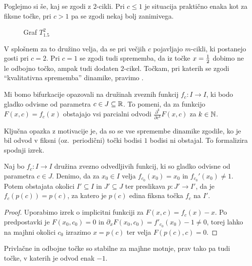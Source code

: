 Poglejmo si še, kaj se zgodi z $2$-cikli.
Pri $c \le 1$ je situacija praktično enaka kot za fiksne točke, pri $c > 1$ pa
se zgodi nekaj bolj zanimivega.

\begin{figure}[h]
  \centering
  \caption{Graf $T_{1.5}^2$}
  \label{fig:ds-02-tc-2}
\end{figure}

V splošnem za to družino velja, da se pri večjih $c$ pojavljajo $m$-cikli, ki
postanejo gosti pri $c = 2$.
Pri $c = 1$ se zgodi tudi sprememba, da iz točke $x = \frac{1}{2}$ dobimo ne le odbojno
točko, ampak tudi dodaten $2$-cikel.
Točkam, pri katerih se zgodi \enquote{kvalitativna sprememba} dinamike, pravimo
.

Mi bomo bifurkacije opazovali na družinah zveznih funkcij $f_c: I \to I$, ki
bodo gladko odvisne od parametra $c \in J \subseteq \mathbb{R}$.
To pomeni, da za funkcijo $F(x, c) = f_c(x)$ obstajajo vsi parcialni odvodi
$\frac{\partial^k}{\partial c^k} F(x,c)$ za $k \in \mathbb{N}$.

Ključna opazka z motivacije je, da so se vse spremembe dinamike zgodile, ko je
bil odvod v fiksni (oz.~periodični) točki bodisi $1$ bodisi ni obstajal.
To formalizira spodnji izrek.

\begin{izrek}
  Naj bo $f_c: I \to I$ družina zvezno odvedljivih funkcij, ki so gladko odvisne
  od parametra $c \in J$.
  Denimo, da za $x_0 \in I$ velja $f_{c_0}(x_0) = x_0$ in $f_{c_0}'(x_0) \ne 1$.
  Potem obstajata okolici $I' \subseteq I$ in $J' \subseteq J$ ter preslikava
  $p: J' \to I'$, da je $f_c(p(c)) = p(c)$, za katero je $p(c)$ edina fiksna
  točka $f_c$ na $I'$.
\end{izrek}

\begin{proof}
  Uporabimo izrek o implicitni funkciji za $F(x,c) = f_c(x) - x$.
  Po predpostavki je $F(x_0, c_0) = 0$ in $\partial_x F(x_0, c_0) =
  f'_{c_0}(x_0) - 1 \ne 0$, torej lahko na majhni okolici $c_0$ izrazimo $x =
  p(c)$ ter velja $F(p(c), c) = 0$.
\end{proof}

\begin{posledica}
  Privlačne in odbojne točke so stabilne za majhne motnje, prav tako pa tudi
  točke, v katerih je odvod enak $-1$.
\end{posledica}

